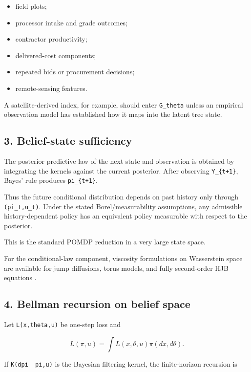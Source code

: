\begin{itemize}
\tightlist
\item
  field plots;
\item
  processor intake and grade outcomes;
\item
  contractor productivity;
\item
  delivered-cost components;
\item
  repeated bids or procurement decisions;
\item
  remote-sensing features.
\end{itemize}

A satellite-derived index, for example, should enter \texttt{G\_theta} unless an
empirical observation model has established how it maps into the latent tree
state.

\subsection{3. Belief-state sufficiency}\label{belief-state-sufficiency}

The posterior predictive law of the next state and observation is obtained by
integrating the kernels against the current posterior. After observing
\texttt{Y\_\{t+1\}}, Bayes' rule produces \texttt{pi\_\{t+1\}}.

Thus the future conditional distribution depends on past history only through
\texttt{(pi\_t,u\_t)}. Under the stated Borel/measurability assumptions, any admissible
history-dependent policy has an equivalent policy measurable with respect to
the posterior.

This is the standard POMDP reduction in a very large state space.

For the conditional-law component, viscosity formulations on Wasserstein space
are available for jump diffusions, torus models, and fully second-order HJB
equations \citep{burzoni2019viscosity,soner2022torus,bayraktar2025hjb}.

\subsection{4. Bellman recursion on belief space}\label{bellman-recursion-on-belief-space}

Let \texttt{L(x,theta,u)} be one-step loss and

\[
\bar L(\pi,u)=\int L(x,\theta,u)\pi(dx,d\theta).
\]

If \texttt{K(dpi\textquotesingle{}\ \textbar{}\ pi,u)} is the Bayesian filtering kernel, the finite-horizon
recursion is

